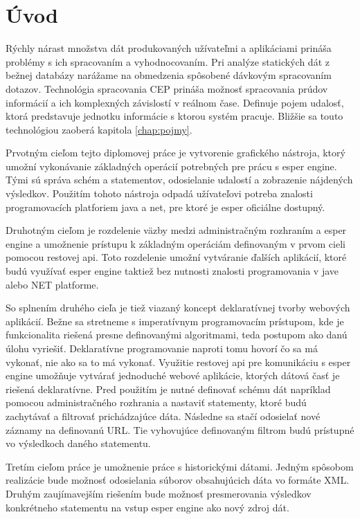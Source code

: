 \chapter*{Úvod}

Rýchly nárast množstva dát produkovaných užívateľmi a aplikáciami prináša problémy s ich spracovaním a vyhodnocovaním. Pri analýze statických dát z bežnej databázy narážame na obmedzenia spôsobené dávkovým spracovaním dotazov. Technológia spracovania \ac{CEP} prináša možnosť spracovania prúdov informácií a ich komplexných závislostí v reálnom čase. Definuje pojem udalosť, ktorá predstavuje jednotku informácie s ktorou systém pracuje. Bližšie sa touto technológiou zaoberá kapitola \ref{chap:pojmy}.

Prvotným cieľom tejto diplomovej práce je vytvorenie grafického nástroja, ktorý umožní vykonávanie základných operácií potrebných pre prácu s esper engine. Tými sú správa schém a statementov, odosielanie udalostí a zobrazenie nájdených výsledkov. Použitím tohoto nástroja odpadá užívateľovi potreba znalosti programovacích platforiem java a net, pre ktoré je esper oficiálne dostupný.

Druhotným cieľom je rozdelenie väzby medzi administračným rozhraním a esper engine a umožnenie prístupu k základným operáciám definovaným v prvom cieli pomocou restovej api. Toto rozdelenie umožní vytváranie ďalších aplikácií, ktoré budú využívať esper engine taktiež bez nutnosti znalosti programovania v jave alebo NET platforme.

So splnením druhého cieľa je tiež viazaný koncept deklaratívnej tvorby webových aplikácií. Bežne sa stretneme s imperatívnym programovacím prístupom, kde je funkcionalita riešená presne definovanými algoritmami, teda postupom ako danú úlohu vyriešiť. Deklaratívne programovanie naproti tomu hovorí čo sa má vykonať, nie ako sa to má vykonať.
Využitie restovej api pre komunikáciu s esper engine umožňuje vytvárať jednoduché webové aplikácie, ktorých dátová časť je riešená deklaratívne. Pred použitím je nutné definovať schému dát napríklad pomocou administračného rozhrania a nastaviť statementy, ktoré budú zachytávať a filtrovať prichádzajúce dáta. Následne sa stačí odosielať nové záznamy na definovanú URL. Tie vyhovujúce definovaným filtrom budú prístupné vo výsledkoch daného statementu.

Tretím cieľom práce je umožnenie práce s historickými dátami. Jedným spôsobom realizácie bude možnosť odosielania súborov obsahujúcich dáta vo formáte XML. Druhým zaujímavejším riešením bude možnosť presmerovania výsledkov konkrétneho statementu na vstup esper engine ako nový zdroj dát.

